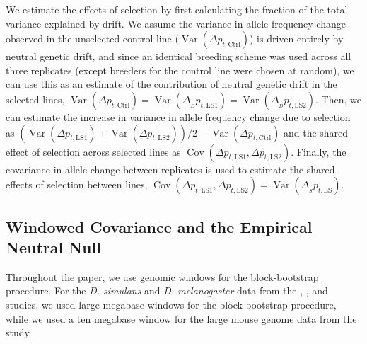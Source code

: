 \documentclass[11pt]{article}
\DeclareMathOperator{\var}{Var}
\DeclareMathOperator{\cov}{Cov}
\begin{document}
We estimate the effects of selection by first calculating the fraction of the
total variance explained by drift. We assume the variance in allele frequency
change observed in the unselected control line ($\var(\Delta
p_{t,\mathrm{Ctrl}})$) is driven entirely by neutral genetic drift, and since
an identical breeding scheme was used across all three replicates (except
breeders for the control line were chosen at random), we can use this as an
estimate of the contribution of neutral genetic drift in the selected lines,
$\var(\Delta p_{t,\mathrm{Ctrl}}) = \var(\Delta_{_{D}} p_{t,\mathrm{LS1}}) =
\var(\Delta_{_{D}} p_{t,\mathrm{LS2}})$. Then, we can estimate the increase in
variance in allele frequency change due to selection as $(\var(\Delta
p_{t,\mathrm{LS1}}) + \var(\Delta p_{t,\mathrm{LS2}}))/2 - \var(\Delta
p_{t,\mathrm{Ctrl}})$ and the shared effect of selection across selected lines
as $\cov(\Delta p_{t,\mathrm{LS1}}, \Delta p_{t,\mathrm{LS2}})$. Finally, the
covariance in allele change between replicates is used to estimate the shared
effects of selection between lines, $\cov(\Delta p_{t,\mathrm{LS1}}, \Delta
p_{t,\mathrm{LS2}}) = \var(\Delta_{_S} p_{t,\mathrm{LS}})$.

\subsection{Windowed Covariance and the Empirical Neutral Null}

Throughout the paper, we use genomic windows for the block-bootstrap procedure.
For the \emph{D. simulans} and \emph{D.  melanogaster} data from the
\textcite{Barghi2019-qy}, \textcite{Kelly2019-dc}, and
\textcite{Bergland2014-ij} studies, we used large megabase windows for the
block bootstrap procedure, while we used a ten megabase window for the large
mouse genome data from the \textcite{Castro2019-uk} study. 
\end{document}
